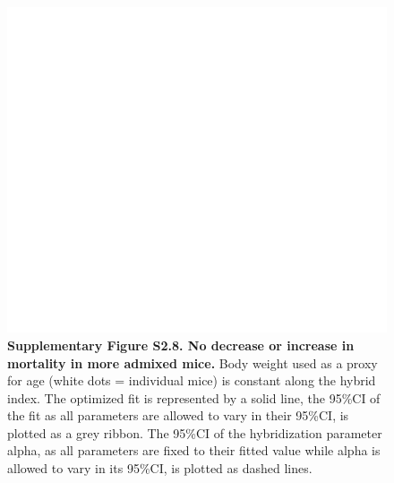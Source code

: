 \begin{figure}[H]
	\centering
	\includegraphics[width=0.8\linewidth,height=\textheight,keepaspectratio]{images/2article1/SupplementaryFigureS8.pdf}
	\captionsetup{labelformat=empty}
	\caption{\textbf{Supplementary Figure S2.8. No decrease or increase in mortality in more admixed mice.} Body weight used as a proxy for age (white dots = individual mice) is constant along the hybrid index. The optimized fit is represented by a solid line, the 95\%CI of the fit as all parameters are allowed to vary in their 95\%CI, is plotted as a grey ribbon. The 95\%CI of the hybridization parameter alpha, as all parameters are fixed to their fitted value while alpha is allowed to vary in its 95\%CI, is plotted as dashed lines.}
\end{figure}

\newpage

